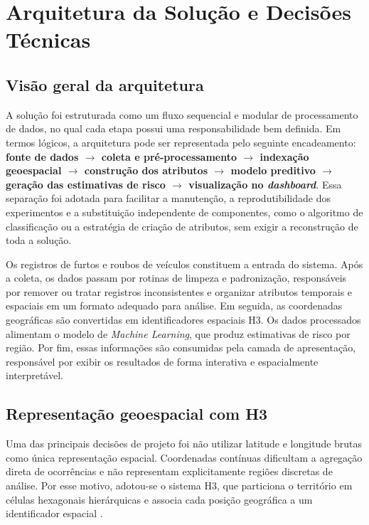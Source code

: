 \documentclass[12pt]{article}
\begin{document}
\section{Arquitetura da Solução e Decisões Técnicas}

\subsection{Visão geral da arquitetura}
A solução foi estruturada como um fluxo sequencial e modular de processamento de dados, no qual cada etapa possui uma responsabilidade bem definida. Em termos lógicos, a arquitetura pode ser representada pelo seguinte encadeamento: \textbf{fonte de dados $\rightarrow$ coleta e pré-processamento $\rightarrow$ indexação geoespacial $\rightarrow$ construção dos atributos $\rightarrow$ modelo preditivo $\rightarrow$ geração das estimativas de risco $\rightarrow$ visualização no \textit{dashboard}}. Essa separação foi adotada para facilitar a manutenção, a reprodutibilidade dos experimentos e a substituição independente de componentes, como o algoritmo de classificação ou a estratégia de criação de atributos, sem exigir a reconstrução de toda a solução.

Os registros de furtos e roubos de veículos constituem a entrada do sistema. Após a coleta, os dados passam por rotinas de limpeza e padronização, responsáveis por remover ou tratar registros inconsistentes e organizar atributos temporais e espaciais em um formato adequado para análise. Em seguida, as coordenadas geográficas são convertidas em identificadores espaciais H3. Os dados processados alimentam o modelo de \textit{Machine Learning}, que produz estimativas de risco por região. Por fim, essas informações são consumidas pela camada de apresentação, responsável por exibir os resultados de forma interativa e espacialmente interpretável.

\subsection{Representação geoespacial com H3}
Uma das principais decisões de projeto foi não utilizar latitude e longitude brutas como única representação espacial. Coordenadas contínuas dificultam a agregação direta de ocorrências e não representam explicitamente regiões discretas de análise. Por esse motivo, adotou-se o sistema H3, que particiona o território em células hexagonais hierárquicas e associa cada posição geográfica a um identificador espacial \cite{uberh3}.
\end{document}
